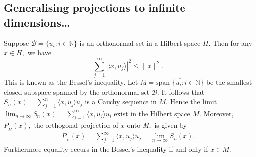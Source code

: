 \subsection{Generalising projections to infinite dimensions\ldots}
\begin{proposition}
Suppose $\mathcal B = \{u_{i} :  i\in \mathbb N\}$ is an orthonormal set in a Hilbert space $H.$ Then for any $x\in H,$ we have $$ \sum_{j=1}^{\infty} |\langle x, u_j\rangle|^2 \leqslant \|x\|^2.$$
This is known as the Bessel's inequality. Let $M= \overline{\text{span } \{u_i: i\in\mathbb N\}}$ be the smallest closed subspace spanned by the orthonormal set $\mathcal B.$ It follows that $S_n(x) = \sum_{j=1}^{n} \langle x, u_j\rangle u_j $ is a Cauchy sequence in $M.$  Hence the limit $\lim_{n\to\infty} S_n(x) =  \sum_{j=1}^{\infty} \langle x, u_j\rangle u_j $ exist in the Hilbert space $M$. Moreover, $P_{_M}(x),$ the orthogonal projection of $x$ onto $M,$ is given by
\begin{align*}
P_{_M}(x)= \sum_{j=1}^{\infty} \langle x, u_j\rangle u_j = \lim_{n\to\infty} S_n(x).
\end{align*}
Furthermore equality occurs in the Bessel's inequality if and only if $x\in M.$
\end{proposition}
